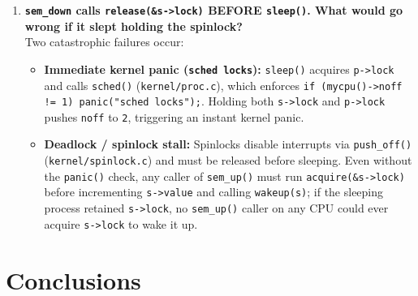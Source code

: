 \documentclass[12pt,a4paper]{article}
\begin{document}
\begin{enumerate}
    \item \textbf{\texttt{sem\_down} calls \texttt{release(\&s->lock)} BEFORE \texttt{sleep()}. What would go wrong if it slept holding the spinlock?} \\
    Two catastrophic failures occur:
    \begin{itemize}
        \item \textbf{Immediate kernel panic (\texttt{sched locks}):} \texttt{sleep()} acquires \texttt{p->lock} and calls \texttt{sched()} (\texttt{kernel/\allowbreak proc.c}), which enforces \texttt{if (mycpu()->noff != 1) panic("sched locks");}. Holding both \texttt{s->lock} and \texttt{p->lock} pushes \texttt{noff} to \texttt{2}, triggering an instant kernel panic.
        \item \textbf{Deadlock / spinlock stall:} Spinlocks disable interrupts via \texttt{push\_\allowbreak off()} (\texttt{kernel/\allowbreak spinlock.c}) and must be released before sleeping. Even without the \texttt{panic()} check, any caller of \texttt{sem\_\allowbreak up()} must run \texttt{acquire(\&s->lock)} before incrementing \texttt{s->value} and calling \texttt{wakeup(s)}; if the sleeping process retained \texttt{s->lock}, no \texttt{sem\_\allowbreak up()} caller on any CPU could ever acquire \texttt{s->lock} to wake it up.
    \end{itemize}
\end{enumerate}

\newpage
\section{Conclusions}
\end{document}
